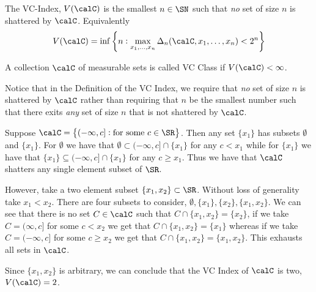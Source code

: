 \begin{definition}[VC Index]
	\label{def:vc-index}
	The VC-Index, \(V(\calC)\) is the smallest \(n\in\SN\) such that \emph{no} set of size \(n\) is shattered by \(\calC\). Equivalently
	\begin{equation}
		\label{eq:vc-index}
		V(\calC) = \inf\left\{n : \max_{x_1,\dots,x_n} \Delta_n(\calC,x_1,\dots,x_n)<2^n\right\}
	\end{equation}
\end{definition}

\begin{definition}[VC Class]
	\label{def:vc-class}
	A collection \(\calC\) of measurable sets is called VC Class if  \(V(\calC)<\infty\). 
\end{definition} 

\begin{remark*}
	Notice that in the Definition of the VC Index, we require that \textit{no} set of size \(n\) is shattered by \(\calC\) rather than requiring that \(n\) be the smallest number such that there exits \textit{any} set of size \(n\) that is not shattered by \(\calC\).
\end{remark*}

\begin{example*}
	\label{ex:vc-indices}
	Suppose \(\calC = \left\{(-\infty,c]:\text{for some }c\in\SR\right\}\). Then any set \(\{x_1\}\) has subsets \(\emptyset\) and \(\{x_1\}.\) For \(\emptyset\) we have that \(\emptyset \subset (-\infty,c]\cap \{x_1\} \) for any \(c < x_1\) while for \(\{x_1\}\) we have that \(\{x_1\}\subseteq (-\infty,c]\cap\{x_1\} \) for any \(c \geq x_1\). Thus we have that \(\calC\) shatters any single element subset of \(\SR\).

	However, take a two element subset \(\{x_1,x_2\}\subset \SR\). Without loss of generality take \(x_1 < x_2\). There are four subsets to consider, \(\emptyset, \{x_1\},\{x_2\},\{x_1,x_2\}\). We can see that there is no set \(C \in \calC\) such that \(C \cap \{x_1,x_2\} = \{x_2\}\), if we take \(C = (\infty,c]\) for some \(c < x_2\) we get that \(C \cap \{x_1,x_2\} = \{x_1\}\) whereas if we take \(C = (-\infty, c]\) for some \(c \geq x_2\) we get that \(C\cap\{x_1,x_2\} = \{x_1,x_2\}\). This exhausts all sets in \(\calC\). 

	Since \(\{x_1,x_2\}\) is arbitrary, we can conclude that the VC Index of \(\calC\) is two, \(V(\calC)=2\).
\end{example*}

